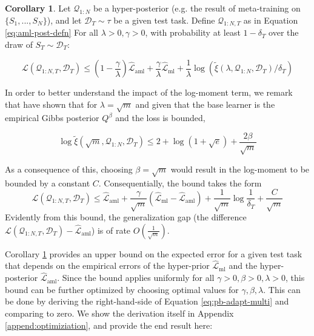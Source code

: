 \documentclass{article}
\theoremstyle{definition}
\newtheorem{corollary}[theorem]{Corollary}
\begin{document}
\begin{corollary} \label{thm:main-result-gibbs}
	Let $\mathcal{Q}_{1:N}$ be a hyper-posterior (e.g. the result of meta-training on $\{S_1,...,S_N\}$), and let $\mathcal{D}_T\sim \tau$ be a given test task. Define  $\mathcal{Q}_{1:N,T}$ as in Equation \ref{eq:aml-post-defn} 
	For all $\lambda>0, \gamma>0$, 
	with probability at least $1-\delta_T$ over the draw of $S_T\sim \mathcal{D}_T$:
	
	\begin{equation*}
	\mathcal{L}(\mathcal{Q}_{1:N,T}, \mathcal{D}_T) \leq 
	(1-\frac{\gamma}{\lambda})\hat{\mathcal{L}}_{\mathrm{aml}} + \frac{\gamma}{\lambda}\hat{\mathcal{L}}_{\mathrm{ml}} 
	+\frac{1}{\lambda}\log\left (\tilde{\xi}(\lambda,\mathcal{Q}_{1:N},\mathcal{D}_T)/\delta_T\right )
	\end{equation*}
\end{corollary}

In order to better understand the impact of the log-moment term, we remark that \citet{Rivasplata2020} have shown that for $\lambda=\sqrt{m}$ and given that the base learner is the empirical Gibbs posterior $Q^\beta$ and the loss is bounded,

$$\log\tilde{\xi}(\sqrt{m},\mathcal{Q}_{1:N},\mathcal{D}_T) \leq 2+\log(1+\sqrt{e})+\frac{2\beta}{\sqrt{m}} $$

As a consequence of this, choosing $\beta=\sqrt{m}$ would result 
in the log-moment to be bounded by a constant $C$. Consequentially, the bound takes the form
$$\mathcal{L}(\mathcal{Q}_{1:N,T}, \mathcal{D}_T) \leq \hat{\mathcal{L}}_{\mathrm{aml}} +
\frac{\gamma}{\sqrt{m}}(\hat{\mathcal{L}}_{\mathrm{ml}}-\hat{\mathcal{L}}_{\mathrm{aml}}) 
+\frac{1}{\sqrt{m}}\log\frac{1}{\delta_T}+\frac{C}{\sqrt{m}}$$
Evidently from this bound, the generalization gap (the difference $\mathcal{L}(\mathcal{Q}_{1:N,T}, \mathcal{D}_T)-\hat{\mathcal{L}}_{\mathrm{aml}}$) is of rate $O\left (\frac{1}{\sqrt{m}}\right )$.


Corollary \ref{thm:main-result-gibbs} provides an upper bound on the expected error for a given test task that depends on the empirical errors of the hyper-prior $\hat{\mathcal{L}}_{\mathrm{ml}}$ and the hyper-posterior $\hat{\mathcal{L}}_{\mathrm{aml}}$. 
Since the bound applies uniformly for all $\gamma>0,\beta>0,\lambda>0$, this bound can be further optimized by choosing optimal values for $\gamma, \beta, \lambda$. This can be done by deriving the right-hand-side of Equation \ref{eq:pb-adapt-multi} and comparing to zero. 
We show the derivation itself in Appendix \ref{append:optimiziation}, and provide the end result here:
\end{document}
